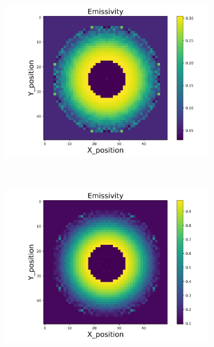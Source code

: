 \begin{figure}[p]
\begin{minipage}{\textwidth}
        \begin{subfigure}{0.325\textwidth}
            \centering
            \includegraphics[width=\textwidth]{figures/raw_data/21/lin_square/emi_cal.jpg}
        \end{subfigure}
    \end{minipage}\\
    \begin{minipage}{\textwidth}
        \centering
        \begin{subfigure}{0.325\textwidth}
            \centering
            \includegraphics[width=\textwidth]{figures/raw_data/22/lin_square/emi_cal.jpg}
        \end{subfigure}

\end{minipage}
\end{figure}
